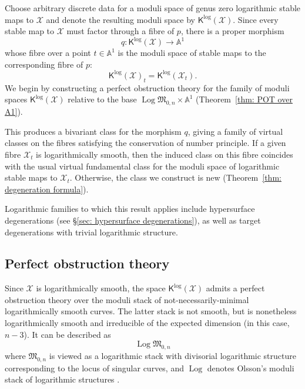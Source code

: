 \documentclass[11pt]{amsart}
\theoremstyle{definition}
\theoremstyle{definition}
\newcommand{\Aaff}{\mathbb{A}}
\newcommand{\Xcal}{\mathcal{X}}
\newcommand{\Mfrak}{\mathfrak{M}}
\newcommand{\Kup}{\mathsf{K}}
\newcommand{\Log}{\operatorname{Log}}
\begin{document}
Choose arbitrary discrete data for a moduli space of genus zero logarithmic stable maps to $\Xcal$ and denote the resulting moduli space by $\Kup^{\log}(\Xcal)$. Since every stable map to $\Xcal$ must factor through a fibre of $p$, there is a proper morphism
\begin{equation*} q \colon \Kup^{\log}(\Xcal) \to \Aaff^{\! 1}\end{equation*}
whose fibre over a point $t \in \Aaff^{\! 1}$ is the moduli space of stable maps to the corresponding fibre of $p$:
\begin{equation*} \Kup^{\log}(\Xcal)_t = \Kup^{\log}(\Xcal_t).\end{equation*}
We begin by constructing a perfect obstruction theory for the family of moduli spaces $\Kup^{\log}(\Xcal)$ relative to the base $\Log\Mfrak_{0,n} \times \Aaff^{\! 1}$ (Theorem~\ref{thm: POT over A1}).

This produces a bivariant class for the morphism $q$, giving a family of virtual classes on the fibres satisfying the conservation of number principle. If a given fibre $\Xcal_t$ is logarithmically smooth, then the induced class on this fibre coincides with the usual virtual fundamental class for the moduli space of logarithmic stable maps to $\Xcal_t$. Otherwise, the class we construct is new (Theorem~\ref{thm: degeneration formula}).

Logarithmic families to which this result applies include hypersurface degenerations (see \S \ref{sec: hypersurface degenerations}), as well as target degenerations with trivial logarithmic structure.

\subsection{Perfect obstruction theory}
Since $\Xcal$ is logarithmically smooth, the space $\Kup^{\log}(\Xcal)$ admits a perfect obstruction theory over the moduli stack of not-necessarily-minimal logarithmically smooth curves. The latter stack is not smooth, but is nonetheless logarithmically smooth and irreducible of the expected dimension (in this case, $n-3$). It can be described \cite[Appendix A]{GrossSiebertLog} as
\begin{equation*} \Log\Mfrak_{0,n} \end{equation*}
where $\Mfrak_{0,n}$ is viewed as a logarithmic stack with divisorial logarithmic structure corresponding to the locus of singular curves, and $\Log$ denotes Olsson's moduli stack of logarithmic structures \cite{OlssonLogStacks}.
\end{document}
